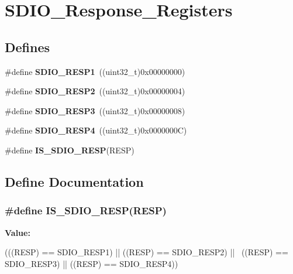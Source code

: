 \hypertarget{group__SDIO__Response__Registers}{
\section{SDIO\_\-Response\_\-Registers}
\label{group__SDIO__Response__Registers}
}
\subsection*{Defines}
\begin{DoxyCompactItemize}
\item 
\hypertarget{group__SDIO__Response__Registers_ga9d78943952cf0e36736313d949520a2d}{
\#define {\bfseries SDIO\_\-RESP1}~((uint32\_\-t)0x00000000)}
\label{group__SDIO__Response__Registers_ga9d78943952cf0e36736313d949520a2d}

\item 
\hypertarget{group__SDIO__Response__Registers_gabd551272af4161844b5358fd3c3c379c}{
\#define {\bfseries SDIO\_\-RESP2}~((uint32\_\-t)0x00000004)}
\label{group__SDIO__Response__Registers_gabd551272af4161844b5358fd3c3c379c}

\item 
\hypertarget{group__SDIO__Response__Registers_gae9887669a72395d54d600829a959d2f4}{
\#define {\bfseries SDIO\_\-RESP3}~((uint32\_\-t)0x00000008)}
\label{group__SDIO__Response__Registers_gae9887669a72395d54d600829a959d2f4}

\item 
\hypertarget{group__SDIO__Response__Registers_ga57c3f6414198e5497736e398c02a1d9e}{
\#define {\bfseries SDIO\_\-RESP4}~((uint32\_\-t)0x0000000C)}
\label{group__SDIO__Response__Registers_ga57c3f6414198e5497736e398c02a1d9e}

\item 
\#define {\bfseries IS\_\-SDIO\_\-RESP}(RESP)
\end{DoxyCompactItemize}


\subsection{Define Documentation}
\hypertarget{group__SDIO__Response__Registers_gaea6a7f75a5e677d50ba5c9ae2d3a7839}{
\subsubsection[{IS\_\-SDIO\_\-RESP}]{\setlength{\rightskip}{0pt plus 5cm}\#define IS\_\-SDIO\_\-RESP(RESP)}}
\label{group__SDIO__Response__Registers_gaea6a7f75a5e677d50ba5c9ae2d3a7839}
{\bfseries Value:}
\begin{DoxyCode}
(((RESP) == SDIO_RESP1) || ((RESP) == SDIO_RESP2) || \
                            ((RESP) == SDIO_RESP3) || ((RESP) == SDIO_RESP4))
\end{DoxyCode}
